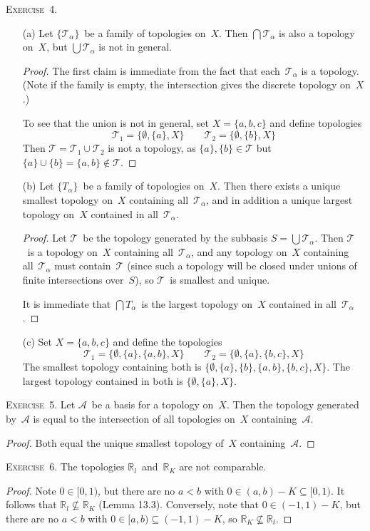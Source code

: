 \documentclass[letterpaper]{article}
\newcommand{\exercise}[1]{\goodbreak\noindent\textsc{Exercise~{#1}.}}
\newcommand{\R}{\mathbb{R}}
\newcommand{\RL}{\R_l}
\newcommand{\RK}{\R_K}
\newcommand{\A}{\mathcal{A}}
\newcommand{\T}{\mathcal{T}}
\newcommand{\union}{\cup}
\newcommand{\bigsect}{\bigcap}
\newcommand{\bigunion}{\bigcup}
\begin{document}
\exercise{4}
\begin{enumerate}
\item[(a)] Let $\{\T_{\alpha}\}$~be a family of topologies on~$X$. Then $\bigsect\T_{\alpha}$ is also a topology on~$X$, but $\bigunion\T_{\alpha}$ is not in general.
\begin{proof}
The first claim is immediate from the fact that each~$\T_{\alpha}$ is a topology. (Note if the family is empty, the intersection gives the discrete topology on~$X$.)

To see that the union is not in general, set $X=\{a,b,c\}$ and define topologies
$$\T_1=\{\emptyset,\{a\},X\}\qquad\T_2=\{\emptyset,\{b\},X\}$$
Then $\T=\T_1\union\T_2$ is not a topology, as $\{a\},\{b\}\in\T$ but $\{a\}\union\{b\}=\{a,b\}\not\in\T$.
\end{proof}

\item[(b)] Let $\{T_{\alpha}\}$~be a family of topologies on~$X$. Then there exists a unique smallest topology on~$X$ containing all~$\T_{\alpha}$, and in addition a unique largest topology on~$X$ contained in all~$\T_{\alpha}$.
\begin{proof}
Let $\T$~be the topology generated by the subbasis $S=\bigunion\T_{\alpha}$. Then $\T$~is a topology on~$X$ containing all~$\T_{\alpha}$, and any topology on~$X$ containing all~$\T_{\alpha}$ must contain~$\T$ (since such a topology will be closed under unions of finite intersections over~$S$), so $\T$~is smallest and unique.

It is immediate that $\bigsect T_{\alpha}$~is the largest topology on~$X$ contained in all~$\T_{\alpha}$.
\end{proof}

\item[(c)]
Set $X=\{a,b,c\}$ and define the topologies
$$\T_1=\{\emptyset,\{a\},\{a,b\},X\}\qquad\T_2=\{\emptyset,\{a\},\{b,c\},X\}$$
The smallest topology containing both is $\{\emptyset,\{a\},\{b\},\{a,b\},\{b,c\},X\}$. The largest topology contained in both is $\{\emptyset,\{a\},X\}$.
\end{enumerate}

\exercise{5}
Let $\A$~be a basis for a topology on~$X$. Then the topology generated by~$\A$ is equal to the intersection of all topologies on~$X$ containing~$\A$.
\begin{proof}
Both equal the unique smallest topology of~$X$ containing~$\A$.
\end{proof}

\exercise{6}
The topologies $\RL$~and~$\RK$ are not comparable.
\begin{proof}
Note $0\in[0,1)$, but there are no $a<b$ with $0\in(a,b)-K\subseteq[0,1)$. It follows that $\RL\not\subseteq\RK$ (Lemma 13.3). Conversely, note that $0\in(-1,1)-K$, but there are no $a<b$ with $0\in [a,b)\subseteq(-1,1)-K$, so $\RK\not\subseteq\RL$.
\end{proof}
\end{document}
